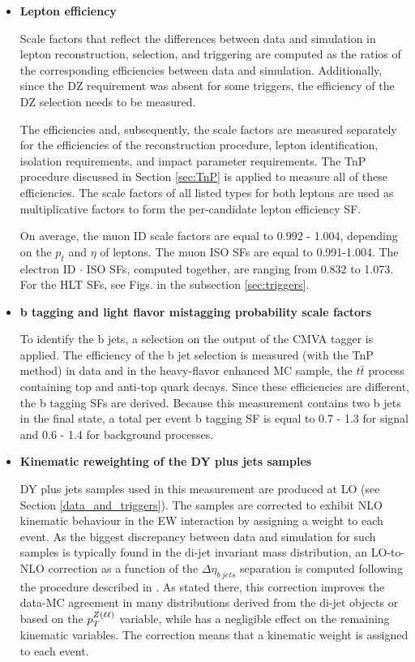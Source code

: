 \begin{itemize}

\item{\bfseries Lepton efficiency} 

Scale factors that reflect the differences between data and simulation in lepton 
reconstruction, selection, and triggering are computed as the ratios of the corresponding
efficiencies between data and simulation. Additionally, since the DZ requirement was absent for some triggers, the efficiency of the DZ selection needs to be measured. 

The efficiencies and, subsequently, the scale factors are measured separately for the efficiencies of the reconstruction procedure, lepton identification, isolation requirements, and impact parameter requirements. The TnP procedure discussed in Section \ref{sec:TnP} is applied to measure all of these efficiencies. The scale factors of all listed types for both leptons are used as multiplicative factors
to form the per-candidate lepton efficiency SF.

On average, the muon ID scale factors are equal to 0.992 - 1.004, depending on the $p_t$ and $\eta$ of leptons. The muon ISO SFs are equal to 0.991-1.004. The electron ID $\cdot$ ISO SFs, computed together, are ranging from 0.832 to 1.073. For the HLT SFs, see Figs. in the subsection \ref{sec:triggers}.

\item{\bfseries b tagging and light flavor mistagging probability scale factors} 

To identify the b jets, a selection on the output of the CMVA tagger is applied. The efficiency of the b jet selection is measured (with the TnP method) in data and in the heavy-flavor enhanced MC sample, the $t\bar{t}$ process containing top and anti-top quark decays. Since these efficiencies are different, the b tagging SFs are derived. Because this measurement contains two b jets in the final state, a total per event b tagging SF is equal to 0.7 - 1.3 for signal and 0.6 - 1.4 for background processes. 

\item{\bfseries Kinematic reweighting of the DY plus jets samples} 
\label{DY_reweighting}

DY plus jets samples used in this measurement are produced at LO (see Section \ref{data_and_triggers}). The samples are corrected to exhibit NLO kinematic behaviour in the EW interaction by assigning a weight to each event. As the biggest discrepancy between data and simulation for such samples is typically found in the di-jet invariant mass distribution, an LO-to-NLO correction as a function of the $\Delta \eta_{b\ jets}$ separation is computed following the procedure described in \cite{DYLOtoNLO}. As stated there, this correction improves the data-MC agreement in many distributions derived from the di-jet objects or based on the $p_T^{Z(\ell\ell)}$ variable, while has a negligible effect on the remaining kinematic variables. The correction means that a kinematic weight is assigned to each event.


\end{itemize}
